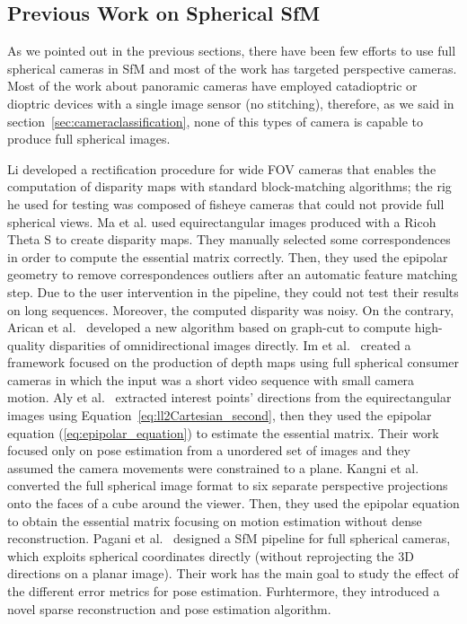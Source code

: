 \subsection{Previous Work on Spherical SfM}
\label{subsec:related_work}
As we pointed out in the previous sections, there have been few efforts to use 
full spherical cameras in SfM and most of the work
has targeted perspective cameras.
Most of the work about panoramic cameras have employed catadioptric or dioptric 
devices with a single image sensor (no stitching), therefore, as we said in 
section~\ref{sec:cameraclassification}, none of this types of camera is capable
to produce full spherical images.

Li\cite{li2008binocular,li2006real} developed a rectification procedure for wide
FOV cameras that enables the computation of disparity maps with standard 
block-matching algorithms; the rig he used for testing was composed of 
fisheye cameras that could not provide full spherical views.
%
Ma et al.\cite{ma20153d} used equirectangular images produced with a 
Ricoh Theta S to create disparity maps. They manually selected some 
correspondences in order to compute the essential matrix correctly. Then, they 
used the epipolar geometry to remove correspondences outliers after an 
automatic feature matching step. Due to the user intervention in 
the pipeline, they could not test their results on long sequences. Moreover, the
computed disparity was noisy.
%
On the contrary, Arican et al.~\cite{arican2007dense} developed a new algorithm
based on graph-cut to compute high-quality disparities of omnidirectional images directly.
%
Im et al.~\cite{im2016all} created a framework focused on the production of depth maps using full spherical consumer cameras in which the input was a short video sequence with small camera motion.
%
Aly et al.~\cite{aly2012street} extracted interest points' directions from the
equirectangular images using Equation~\ref{eq:ll2Cartesian_second}, then they used the 
epipolar equation (\ref{eq:epipolar_equation}) to estimate the essential matrix.
Their work focused only on pose estimation from a unordered set of images
and they assumed the camera movements were constrained to a plane.
%
Kangni et al.~\cite{kangni2007orientation} converted the full spherical image format to six 
separate perspective projections onto the faces of a cube around the viewer. 
Then, they used the epipolar equation to obtain the essential matrix focusing on motion estimation without dense reconstruction.
Pagani et al.~\cite{pagani2011structure} designed a SfM pipeline for full
spherical cameras, which exploits spherical coordinates directly (without 
reprojecting the 3D directions on a planar image). Their work has the main
goal to study the effect of the different error metrics for pose estimation.
Furhtermore, they introduced a novel sparse reconstruction and pose estimation algorithm.

